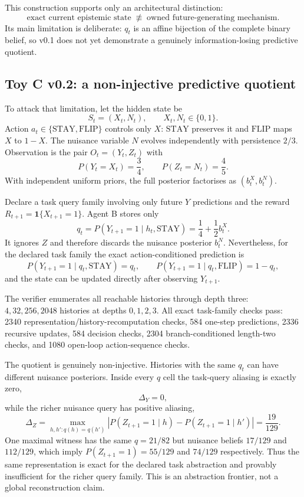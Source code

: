 \documentclass[10pt]{article}
\begin{document}
This construction supports only an architectural distinction:
\[
\text{exact current epistemic state}
\;\not\equiv\;
\text{owned future-generating mechanism}.
\]
Its main limitation is deliberate: $q_t$ is an affine bijection of the complete binary belief, so v0.1 does not yet demonstrate a genuinely information-losing predictive quotient.

\subsection{Toy C v0.2: a non-injective predictive quotient}

To attack that limitation, let the hidden state be
\[
S_t=(X_t,N_t),\qquad X_t,N_t\in\{0,1\}.
\]
Action $a_t\in\{\mathrm{STAY},\mathrm{FLIP}\}$ controls only $X$: $\mathrm{STAY}$ preserves it and $\mathrm{FLIP}$ maps $X$ to $1-X$. The nuisance variable $N$ evolves independently with persistence $2/3$. Observation is the pair $O_t=(Y_t,Z_t)$ with
\[
P(Y_t=X_t)=\frac34,
\qquad
P(Z_t=N_t)=\frac45.
\]
With independent uniform priors, the full posterior factorises as $(b_t^X,b_t^N)$.

Declare a task query family involving only future $Y$ predictions and the reward $R_{t+1}=\mathbf 1\{X_{t+1}=1\}$. Agent B stores only
\[
q_t=P(Y_{t+1}=1\mid h_t,\mathrm{STAY})
=\frac14+\frac12 b_t^X.
\]
It ignores $Z$ and therefore discards the nuisance posterior $b_t^N$. Nevertheless, for the declared task family the exact action-conditioned prediction is
\[
P(Y_{t+1}=1\mid q_t,\mathrm{STAY})=q_t,
\qquad
P(Y_{t+1}=1\mid q_t,\mathrm{FLIP})=1-q_t,
\]
and the state can be updated directly after observing $Y_{t+1}$.

The verifier enumerates all reachable histories through depth three: $4,32,256,2048$ histories at depths $0,1,2,3$. All exact task-family checks pass: 2340 representation/history-recomputation checks, 584 one-step predictions, 2336 recursive updates, 584 decision checks, 2304 branch-conditioned length-two checks, and 1080 open-loop action-sequence checks.

The quotient is genuinely non-injective. Histories with the same $q_t$ can have different nuisance posteriors. Inside every $q$ cell the task-query aliasing is exactly zero,
\[
\Delta_Y=0,
\]
while the richer nuisance query has positive aliasing,
\[
\Delta_Z
=\max_{h,h':q(h)=q(h')}
\left|P(Z_{t+1}=1\mid h)-P(Z_{t+1}=1\mid h')\right|
=\frac{19}{129}.
\]
One maximal witness has the same $q=21/82$ but nuisance beliefs $17/129$ and $112/129$, which imply $P(Z_{t+1}=1)=55/129$ and $74/129$ respectively. Thus the same representation is exact for the declared task abstraction and provably insufficient for the richer query family. This is an abstraction frontier, not a global reconstruction claim.
\end{document}
